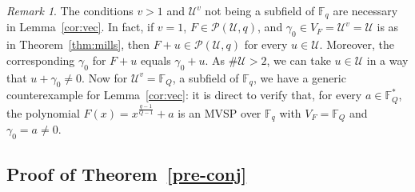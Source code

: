 \documentclass[11pt]{amsart}
\newcommand{\F}{\mathbb{F}}
\theoremstyle{definition}
\theoremstyle{remark}
\newtheorem{remark}[theorem]{Remark}
\begin{document}
 

 
 


\begin{remark}
The conditions $v>1$ and $\mathcal{U}^v$ not being a subfield of $\F_q$ are necessary in Lemma~\ref{cor:vec}. In fact, if $v=1$, $F\in \mathcal P(\mathcal U, q)$, and $\gamma_0 \in V_F=\mathcal U^v=\mathcal U$ is as in Theorem~\ref{thm:mills}, then $F+u\in  \mathcal P(\mathcal U, q)$ for every $u\in \mathcal U$. Moreover, the corresponding $\gamma_0$ for $F+u$ equals $\gamma_0+u$. As $\#\mathcal U>2$, we can take $u\in \mathcal U$ in a way that $u+\gamma_0\ne 0$. Now for $\mathcal U^v=\F_{Q}$, a subfield of $\F_q$, we have a generic counterexample
for Lemma~\ref{cor:vec}: it is direct to verify that, for every $a\in \F_Q^*$, the polynomial $F(x)=x^{\frac{q-1}{Q-1}}+a$ is an MVSP over $\F_q$ with $V_F=\F_{Q}$ and $\gamma_0=a\ne 0$.
\end{remark}





\subsection{Proof of Theorem~\ref{pre-conj}}
\end{document}
